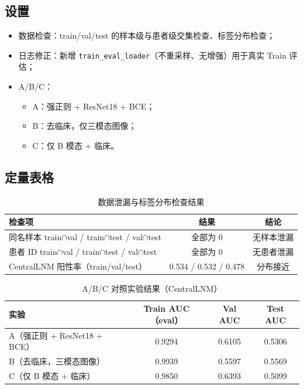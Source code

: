 \documentclass[12pt,a4paper]{ctexart}
\begin{document}
\subsection{设置}
\begin{itemize}
  \item 数据检查：train/val/test 的样本级与患者级交集检查、标签分布检查；
  \item 日志修正：新增 \texttt{train\_eval\_loader}（不重采样、无增强）用于真实 Train 评估；
  \item A/B/C：
  \begin{itemize}
    \item A：强正则 + ResNet18 + BCE；
    \item B：去临床，仅三模态图像；
    \item C：仅 B 模态 + 临床。
  \end{itemize}
\end{itemize}

\subsection{定量表格}
\begin{table}[H]
\centering
\caption{数据泄漏与标签分布检查结果}
\begin{tabular}{lcc}
\toprule
检查项 & 结果 & 结论 \\
\midrule
同名样本 train$\cap$val / train$\cap$test / val$\cap$test & 全部为 0 & 无样本泄漏 \\
患者 ID train$\cap$val / train$\cap$test / val$\cap$test & 全部为 0 & 无患者泄漏 \\
CentralLNM 阳性率（train/val/test） & 0.534 / 0.532 / 0.478 & 分布接近 \\
\bottomrule
\end{tabular}
\end{table}

\begin{table}[H]
\centering
\caption{A/B/C 对照实验结果（CentralLNM）}
\begin{tabular}{lccc}
\toprule
实验 & Train AUC（eval） & Val AUC & Test AUC \\
\midrule
A（强正则 + ResNet18 + BCE） & 0.9294 & 0.6105 & 0.5306 \\
B（去临床，三模态图像） & 0.9939 & 0.5597 & 0.5569 \\
C（仅 B 模态 + 临床） & 0.9850 & 0.6393 & 0.5099 \\
\bottomrule
\end{tabular}
\end{table}
\end{document}
